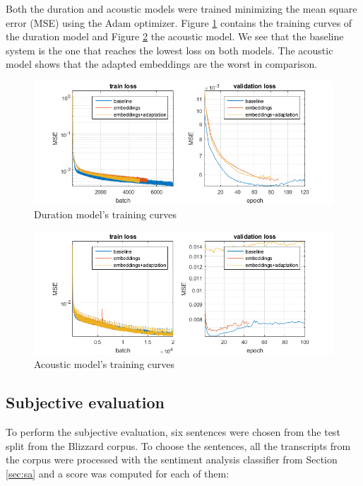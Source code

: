 Both the duration and acoustic models were trained minimizing the mean square error (MSE) using the Adam \cite{kingma2014adam} optimizer. Figure \ref{fig:loss-dur} contains the training curves of the duration model and Figure \ref{fig:loss-aco} the acoustic model. We see that the baseline system is the one that reaches the lowest loss on both models. The acoustic model shows that the adapted embeddings are the worst in comparison.

\begin{figure}[h]
    \centering
    \includegraphics[width=14cm]{figures/duration}
    \caption{Duration model's training curves}
    \label{fig:loss-dur}
\end{figure}

\begin{figure}[h]
    \centering
    \includegraphics[width=14cm]{figures/aco}
    \caption{Acoustic model's training curves}
    \label{fig:loss-aco}
\end{figure}

\subsection{Subjective evaluation}

To perform the subjective evaluation, six sentences were chosen from the test split from the Blizzard corpus. To choose the sentences, all the transcripts from the corpus were processed with the sentiment analysis classifier from Section \ref{sec:sa} and a score was computed for each of them:

